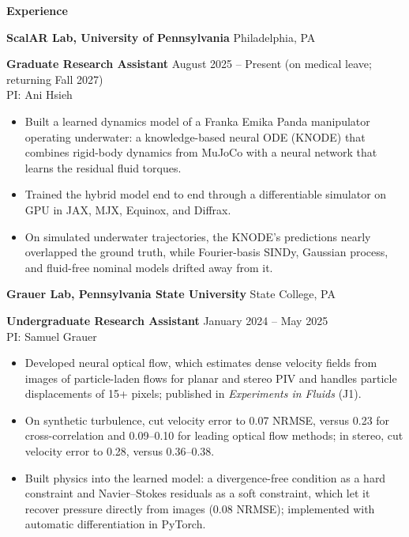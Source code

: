 \begin{center}
    \textbf{Experience}
\end{center}
\textbf{ScalAR Lab, University of Pennsylvania} \hfill Philadelphia, PA

\textbf{Graduate Research Assistant} \hfill August 2025 -- Present (on medical leave; returning Fall 2027)\\
PI: Ani Hsieh
\begin{itemize}[noitemsep, topsep=0pt, partopsep=0pt, parsep=0pt]
    \item Built a learned dynamics model of a Franka Emika Panda manipulator operating underwater: a knowledge-based neural ODE (KNODE) that combines rigid-body dynamics from MuJoCo with a neural network that learns the residual fluid torques.

    \item Trained the hybrid model end to end through a differentiable simulator on GPU in JAX, MJX, Equinox, and Diffrax.

    \item On simulated underwater trajectories, the KNODE's predictions nearly overlapped the ground truth, while Fourier-basis SINDy, Gaussian process, and fluid-free nominal models drifted away from it.
\end{itemize}

\vspace{12pt}

\textbf{Grauer Lab, Pennsylvania State University} \hfill State College, PA

\textbf{Undergraduate Research Assistant} \hfill January 2024 -- May 2025\\
PI: Samuel Grauer
\begin{itemize}[noitemsep, topsep=0pt, partopsep=0pt, parsep=0pt]
    \item Developed neural optical flow, which estimates dense velocity fields from images of particle-laden flows for planar and stereo PIV and handles particle displacements of 15+ pixels; published in \textit{Experiments in Fluids} (J1).

    \item On synthetic turbulence, cut velocity error to 0.07 NRMSE, versus 0.23 for cross-correlation and 0.09--0.10 for leading optical flow methods; in stereo, cut velocity error to 0.28, versus 0.36--0.38.

    \item Built physics into the learned model: a divergence-free condition as a hard constraint and Navier--Stokes residuals as a soft constraint, which let it recover pressure directly from images (0.08 NRMSE); implemented with automatic differentiation in PyTorch.
\end{itemize}


